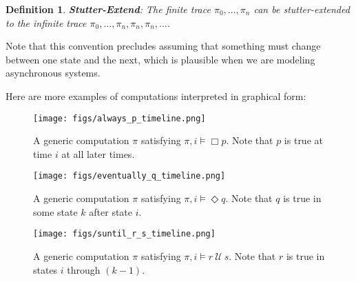 \documentclass{elsarticle} %
\newtheorem{defin}{Definition}
\begin{document}
\begin{defin} {\bf Stutter-Extend}: 
The finite trace $\pi_0, \ldots, \pi_n$ can be stutter-extended to the infinite trace $\pi_0, \ldots, \pi_n, \pi_n, \pi_n, \ldots$.
\end{defin}

Note that this convention precludes assuming that something must change between one state and the next, which is plausible when we are modeling asynchronous systems. 




Here are more examples of computations interpreted in graphical form:

\begin{figure}[H]

  \begin{center}
    \texttt{[image: figs/always\_p\_timeline.png]}
  \end{center}

\caption{A generic computation $\pi$ satisfying $\pi, i \vDash \Box p$. Note that $p$ is true at time $i$ at all later times.}
\end{figure}


\begin{figure}[H]

  \begin{center}
    \texttt{[image: figs/eventually\_q\_timeline.png]}
  \end{center}

\caption{A generic computation $\pi$ satisfying $\pi, i \vDash \Diamond q$. Note that $q$ is true in some state $k$ after state $i$.}
\end{figure}


\begin{figure}[H]

  \begin{center}
    \texttt{[image: figs/suntil\_r\_s\_timeline.png]}
  \end{center}

\caption{A generic computation $\pi$ satisfying $\pi, i \vDash r \ \mathcal{U}\ s$. Note that $r$ is true in states $i$ through $(k - 1)$.}
\end{figure}
\end{document}
